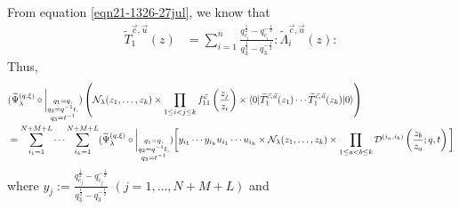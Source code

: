 \documentclass[12pt,reqno,a4paper]{amsart}
\newcommand{\comp}{\circ}
\newcommand{\cals}[1]{\mathcal{#1}}
\newcommand{\normord}[1]{:\mathrel{#1}:}
\numberwithin{equation}{section}
\newcommand{\dualmap}{
\widetilde{\Psi}^{(q,\xi)}_{\lambda}
}
\theoremstyle{definition}
\begin{document}
From equation \eqref{eqn21-1326-27jul}, we know that 
\begin{align}
	\widetilde{T}^{\vec{c},\vec{u}}_1(z)
	&= 
	\sum_{i = 1}^{n}
	\frac{
		q_{c_i}^{\frac{1}{2}} - q_{c_i}^{-\frac{1}{2}}
	}{
		q_{3}^{\frac{1}{2}} - q_{3}^{-\frac{1}{2}}
	}
	\normord{
		\widetilde{		\Lambda		}^{\vec{c},\vec{u}}_i(z)
	}
\end{align}
Thus, 
\footnotesize
\begin{align}
	&
	(
	\dualmap
	\comp 
	\bigg|_{
		\substack{
			q_1 = q, \\
			q_2 = q^{-1}t,\\
			q_3 = t^{-1} \\
		}
	}
	)
	\left(
	\cals{N}_{\lambda}(z_1,\dots,z_k )
	\times
	\prod_{1 \leq i < j \leq k}f^{\vec{c}}_{11}\left(\frac{z_j}{z_i} \right)
	\times
	\langle 0 |\widetilde{T}^{\vec{c},\vec{u}}_{1}(z_1 )\cdots \widetilde{T}^{\vec{c},\vec{u}}_{1}(z_k )|0\rangle
	\right)
	\\
	&= 
	\sum_{i_1 = 1}^{N+M+L}
	\cdots
	\sum_{i_k = 1}^{N+M+L}
	(
	\dualmap
	\comp 
	\bigg|_{
		\substack{
			q_1 = q, \\
			q_2 = q^{-1}t,\\
			q_3 = t^{-1} \\
		}
	}
	)
	\bigg[
	y_{i_1}\cdots y_{i_k}
	u_{i_1}\cdots u_{i_k}
	\times
	\cals{N}_\lambda(z_1,\dots,z_k)
	\times
	\prod_{1 \leq a < b \leq k}
	\cals{D}^{(i_a,i_b)}\left(
	\frac{z_b}{z_a}
	; q, t
	\right)
	\bigg]
	\notag 
\end{align}
\normalsize
where 
$\displaystyle y_j :=
\frac{
	q_{c_j}^{\frac{1}{2}} - q_{c_j}^{-\frac{1}{2}}
}{
	q_{3}^{\frac{1}{2}} - q_{3}^{-\frac{1}{2}}
}
\,\, (j = 1,\dots,N+M+L)$
and 
\footnotesize 
\end{document}
